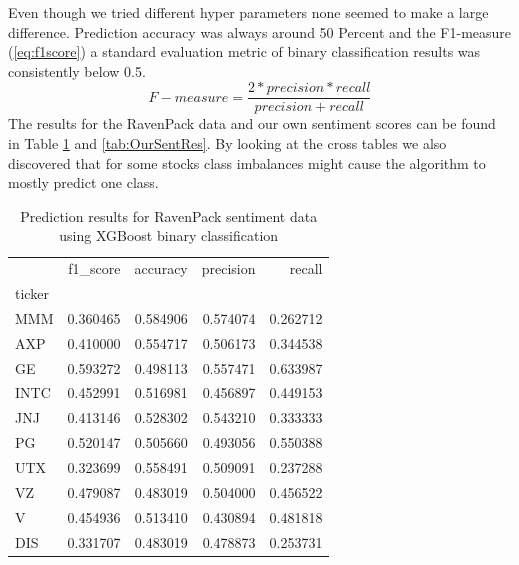 Even though we tried different hyper parameters none seemed to make a large difference. Prediction accuracy was always around 50 Percent and the F1-measure (\ref{eq:f1score}) a standard evaluation metric of binary classification results \citep{HADDI201326} was consistently below 0.5.
\begin{equation} 
    F-measure = \frac{2*precision * recall}{precision + recall}
\end{equation}\label{eq:f1score}
The results for the RavenPack data and our own sentiment scores can be found in Table \ref{tab:RavSentRes} and \ref{tab:OurSentRes}. By looking at the cross tables we also discovered that for some stocks class imbalances might cause the algorithm to mostly predict one class. 
\begin{table}[h]
\centering
\begin{tabular}{lrrrr}
\toprule
{} &  f1\_score &  accuracy &  precision &    recall \\
ticker &           &           &            &           \\
\midrule
MMM    &  0.360465 &  0.584906 &   0.574074 &  0.262712 \\
AXP    &  0.410000 &  0.554717 &   0.506173 &  0.344538 \\
GE     &  0.593272 &  0.498113 &   0.557471 &  0.633987 \\
INTC   &  0.452991 &  0.516981 &   0.456897 &  0.449153 \\
JNJ    &  0.413146 &  0.528302 &   0.543210 &  0.333333 \\
PG     &  0.520147 &  0.505660 &   0.493056 &  0.550388 \\
UTX    &  0.323699 &  0.558491 &   0.509091 &  0.237288 \\
VZ     &  0.479087 &  0.483019 &   0.504000 &  0.456522 \\
V      &  0.454936 &  0.513410 &   0.430894 &  0.481818 \\
DIS    &  0.331707 &  0.483019 &   0.478873 &  0.253731 \\
\bottomrule
\end{tabular}
    \label{tab:RavSentRes}
    \caption{Prediction results for RavenPack sentiment data using XGBoost binary classification}
\end{table}
%
